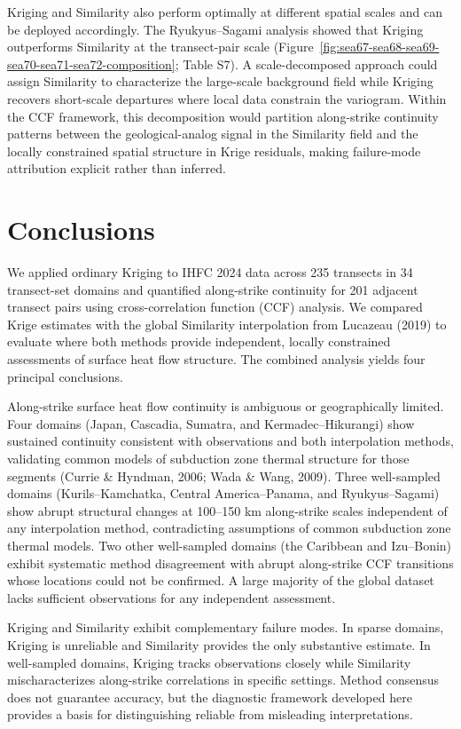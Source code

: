 \documentclass[draft,linenumbers]{agujournal2019}
\begin{document}
Kriging and Similarity also perform optimally at different spatial
scales and can be deployed accordingly. The Ryukyus--Sagami analysis
showed that Kriging outperforms Similarity at the transect-pair scale
(Figure~\ref{fig:sea67-sea68-sea69-sea70-sea71-sea72-composition}; Table
S7). A scale-decomposed approach could assign Similarity to characterize
the large-scale background field while Kriging recovers short-scale
departures where local data constrain the variogram. Within the CCF
framework, this decomposition would partition along-strike continuity
patterns between the geological-analog signal in the Similarity field
and the locally constrained spatial structure in Krige residuals, making
failure-mode attribution explicit rather than inferred.

\section{Conclusions}\label{sec:conclusions}

We applied ordinary Kriging to IHFC 2024 data across 235 transects in 34
transect-set domains and quantified along-strike continuity for 201
adjacent transect pairs using cross-correlation function (CCF) analysis.
We compared Krige estimates with the global Similarity interpolation
from Lucazeau (2019) to evaluate where both methods provide independent,
locally constrained assessments of surface heat flow structure. The
combined analysis yields four principal conclusions.

Along-strike surface heat flow continuity is ambiguous or geographically
limited. Four domains (Japan, Cascadia, Sumatra, and
Kermadec--Hikurangi) show sustained continuity consistent with
observations and both interpolation methods, validating common models of
subduction zone thermal structure for those segments (Currie \& Hyndman,
2006; Wada \& Wang, 2009). Three well-sampled domains
(Kurils--Kamchatka, Central America--Panama, and Ryukyus--Sagami) show
abrupt structural changes at 100--150 km along-strike scales independent
of any interpolation method, contradicting assumptions of common
subduction zone thermal models. Two other well-sampled domains (the
Caribbean and Izu--Bonin) exhibit systematic method disagreement with
abrupt along-strike CCF transitions whose locations could not be
confirmed. A large majority of the global dataset lacks sufficient
observations for any independent assessment.

Kriging and Similarity exhibit complementary failure modes. In sparse
domains, Kriging is unreliable and Similarity provides the only
substantive estimate. In well-sampled domains, Kriging tracks
observations closely while Similarity mischaracterizes along-strike
correlations in specific settings. Method consensus does not guarantee
accuracy, but the diagnostic framework developed here provides a basis
for distinguishing reliable from misleading interpretations.
\end{document}
